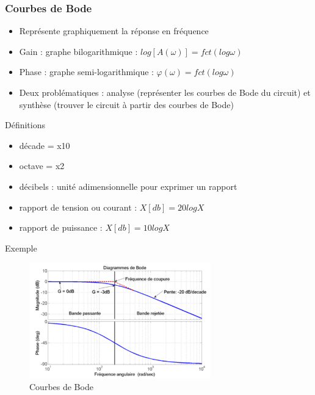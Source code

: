 \documentclass[a4paper]{article}
\begin{document}
        \subsubsection{Courbes de Bode}
            \begin{itemize}
                \item Représente graphiquement la réponse en fréquence
                \item Gain : graphe bilogarithmique : $ log[A(\omega)] = fct(log \omega) $
                \item Phase : graphe semi-logarithmique : $ \varphi(\omega) = fct(log \omega) $
                \item Deux problématiques : analyse (représenter les courbes de Bode du circuit) et synthèse (trouver le circuit à partir des courbes de Bode)
            \end{itemize}
            Définitions
            \begin{itemize}
                \item décade = x10
                \item octave = x2
                \item décibels : unité adimensionnelle pour exprimer un rapport
                \item rapport de tension ou courant : $ X[db] = 20logX $
                \item rapport de puissance : $ X[db] = 10logX $
            \end{itemize}
            Exemple
            \begin{figure}[H]
                \begin{center}
                    \includegraphics[width=0.7\textwidth]{fig/2_courbesbode.png}
                    \caption{Courbes de Bode}
                    \label{fig:2_superposition}
                \end{center}
            \end{figure}
\end{document}
